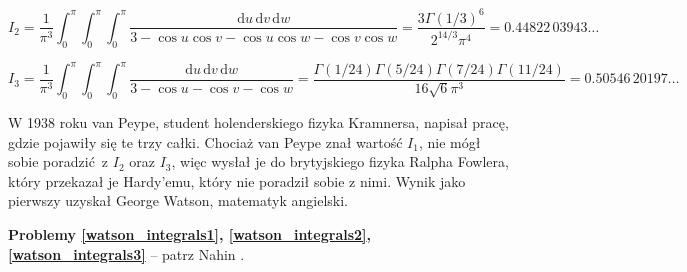 \begin{problem_with_solution}
    \label{watson_integrals2}%
    \begin{equation}
        I_2 = \frac{1}{\pi^3} \int_0^\pi\int_0^\pi\int_0^\pi \frac{\mathrm{d}u \, \mathrm{d}v \, \mathrm{d}w}{3 - \cos u \cos v - \cos u \cos w - \cos v \cos w} = \frac{3 \Gamma(1/3)^6}{2^{14/3} \pi^4} = 0.44822\,03943\ldots
    \end{equation}
\end{problem_with_solution}

\begin{problem_with_solution}
    \label{watson_integrals3}%
    \begin{equation}
        I_3 = \frac{1}{\pi^3} \int_0^\pi\int_0^\pi\int_0^\pi \frac{\mathrm{d}u \, \mathrm{d}v \, \mathrm{d}w}{3 - \cos u - \cos v - \cos w} = \frac{\Gamma(1/24) \Gamma(5/24) \Gamma(7/24) \Gamma(11/24)}{16 \sqrt{6} \pi^3} = 0.50546\,20197\ldots
    \end{equation}
\end{problem_with_solution}

W 1938 roku van Peype, student holenderskiego fizyka Kramnersa, napisał pracę, gdzie pojawiły się te trzy całki.
Chociaż van Peype znał wartość $I_1$, nie mógł sobie poradzić z $I_2$ oraz $I_3$, więc wysłał je do brytyjskiego fizyka Ralpha Fowlera, który przekazał je Hardy'emu, który nie poradził sobie z nimi.
Wynik jako pierwszy uzyskał George Watson, matematyk angielski.

\textbf{Problemy \ref{watson_integrals1}, \ref{watson_integrals2}, \ref{watson_integrals3}} -- patrz Nahin \cite[s. 206-212]{nahin15}.


%